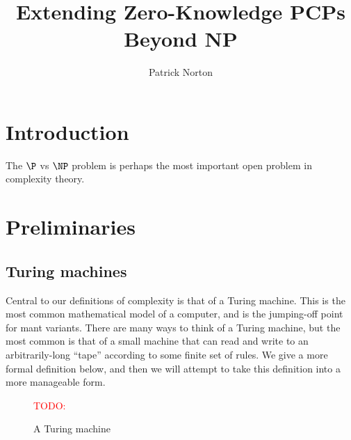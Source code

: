 \documentclass[english,12pt]{reedthesis}
\title{Extending Zero-Knowledge PCPs Beyond NP}
\author{Patrick Norton}
\theoremstyle{plain}
\theoremstyle{definition}
\theoremstyle{remark}
\newcommand{\TODO}[1]{\textcolor{red}{TODO: #1}}
\begin{document}
\maketitle

\tableofcontents

\listofalgorithms


\chapter*{Introduction}

The $\P$ vs $\NP$ problem is perhaps the most important open problem in
complexity theory.

\chapter{Preliminaries}

\section{Turing machines}


Central to our definitions of complexity is that of a Turing machine. This is
the most common mathematical model of a computer, and is the jumping-off point
for mant variants. There are many ways to think of a Turing machine, but the
most common is that of a small machine that can read and write to an
arbitrarily-long ``tape'' according to some finite set of rules. We give a more
formal definition below, and then we will attempt to take this definition into a
more manageable form.

\begin{figure}[htbp]
  \centering
  \TODO{}
  \begin{tikzpicture}
  \end{tikzpicture}
  \caption{A Turing machine}\label{fig:tm}
\end{figure}
\end{document}
